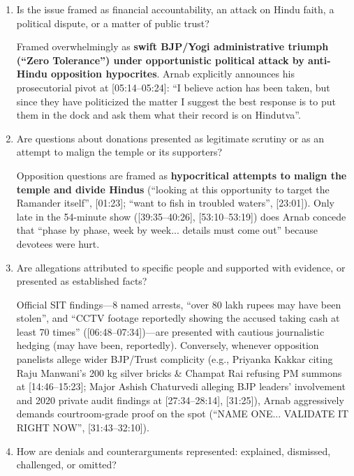 \documentclass[10pt,a4paper]{article}
\begin{document}
\begin{enumerate}[leftmargin=1.5em, itemsep=6pt, topsep=4pt]
  \textbf{People Making Allegations:} Demonized en masse in the opening monologue as ``People who say let's divide Hindus... People who did not want the Ram mandr itself... People who said Lord Ram did never exist'' ([01:23--01:52]), ``don't have the asta [faith] to visit the Ram temple'' ([04:18]), and heirs to Mulayam Singh Yadav's ``GENOCIDE OF CAR SEAKS'' ([04:47--05:06]).
  \item Is the issue framed as financial accountability, an attack on Hindu faith, a political dispute, or a matter of public trust?\par\smallskip
  Framed overwhelmingly as \textbf{swift BJP/Yogi administrative triumph (``Zero Tolerance'') under opportunistic political attack by anti-Hindu opposition hypocrites}. Arnab explicitly announces his prosecutorial pivot at [05:14--05:24]: ``I believe action has been taken, but since they have politicized the matter I suggest the best response is to put them in the dock and ask them what their record is on Hindutva''.
  \item Are questions about donations presented as legitimate scrutiny or as an attempt to malign the temple or its supporters?\par\smallskip
  Opposition questions are framed as \textbf{hypocritical attempts to malign the temple and divide Hindus} (``looking at this opportunity to target the Ramander itself'', [01:23]; ``want to fish in troubled waters'', [23:01]). Only late in the 54-minute show ([39:35--40:26], [53:10--53:19]) does Arnab concede that ``phase by phase, week by week... details must come out'' because devotees were hurt.
  \item Are allegations attributed to specific people and supported with evidence, or presented as established facts?\par\smallskip
  Official SIT findings---8 named arrests, ``over 80 lakh rupees may have been stolen'', and ``CCTV footage reportedly showing the accused taking cash at least 70 times'' ([06:48--07:34])---are presented with cautious journalistic hedging (may have been, reportedly). Conversely, whenever opposition panelists allege wider BJP/Trust complicity (e.g., Priyanka Kakkar citing Raju Manwani's 200 kg silver bricks \& Champat Rai refusing PM summons at [14:46--15:23]; Major Ashish Chaturvedi alleging BJP leaders' involvement and 2020 private audit findings at [27:34--28:14], [31:25]), Arnab aggressively demands courtroom-grade proof on the spot (``NAME ONE... VALIDATE IT RIGHT NOW'', [31:43--32:10]).
  \item How are denials and counterarguments represented: explained, dismissed, challenged, or omitted?\par\smallskip

\end{enumerate}
\end{document}
